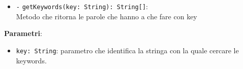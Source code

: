 \begin{itemize}
\begin{itemize}
\begin{itemize}
		\end{itemize}
		\item \texttt{-} \texttt{getKeywords(key: String): String[]}: \\ Metodo che ritorna le parole che hanno a che fare con key
	\end{itemize}
	\textbf{Parametri}:
	\begin{itemize}
		\item \texttt{key: String}: parametro che identifica la stringa con la quale cercare le keywords. 
	\end{itemize}
\end{itemize}